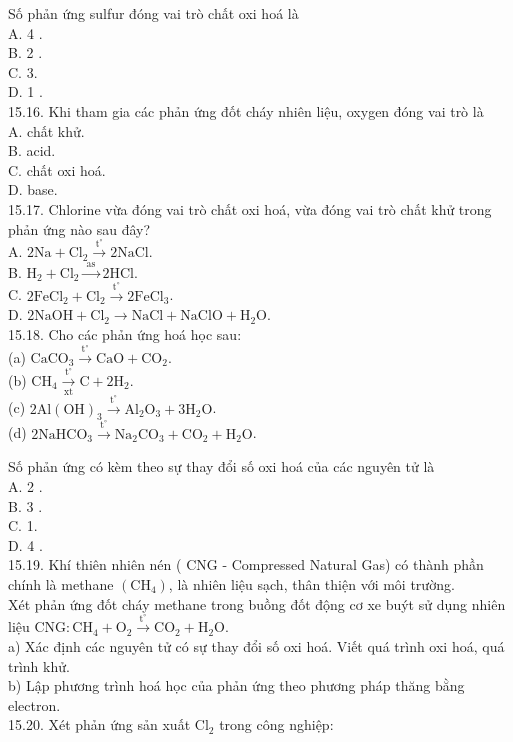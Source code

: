 \documentclass[10pt]{article}
\begin{document}
Số phản ứng sulfur đóng vai trò chất oxi hoá là\\
A. 4 .\\
B. 2 .\\
C. 3.\\
D. 1 .\\
15.16. Khi tham gia các phản ứng đốt cháy nhiên liệu, oxygen đóng vai trò là\\
A. chất khử.\\
B. acid.\\
C. chất oxi hoá.\\
D. base.\\
15.17. Chlorine vừa đóng vai trò chất oxi hoá, vừa đóng vai trò chất khử trong phản ứng nào sau đây?\\
A. $2 \mathrm{Na}+\mathrm{Cl}_{2} \xrightarrow{\mathrm{t}^{\circ}} 2 \mathrm{NaCl}$.\\
B. $\mathrm{H}_{2}+\mathrm{Cl}_{2} \xrightarrow{\text { as }} 2 \mathrm{HCl}$.\\
C. $2 \mathrm{FeCl}_{2}+\mathrm{Cl}_{2} \xrightarrow{\mathrm{t}^{\circ}} 2 \mathrm{FeCl}_{3}$.\\
D. $2 \mathrm{NaOH}+\mathrm{Cl}_{2} \longrightarrow \mathrm{NaCl}+\mathrm{NaClO}+\mathrm{H}_{2} \mathrm{O}$.\\
15.18. Cho các phản ứng hoá học sau:\\
(a) $\mathrm{CaCO}_{3} \xrightarrow{\mathrm{t}^{\circ}} \mathrm{CaO}+\mathrm{CO}_{2}$.\\
(b) $\mathrm{CH}_{4} \xrightarrow[\mathrm{xt}]{\mathrm{t}^{\circ}} \mathrm{C}+2 \mathrm{H}_{2}$.\\
(c) $2 \mathrm{Al}(\mathrm{OH})_{3} \xrightarrow{\mathrm{t}^{\circ}} \mathrm{Al}_{2} \mathrm{O}_{3}+3 \mathrm{H}_{2} \mathrm{O}$.\\
(d) $2 \mathrm{NaHCO}_{3} \xrightarrow{\mathrm{t}^{\circ}} \mathrm{Na}_{2} \mathrm{CO}_{3}+\mathrm{CO}_{2}+\mathrm{H}_{2} \mathrm{O}$.

Số phản ứng có kèm theo sự thay đổi số oxi hoá của các nguyên tử là\\
A. 2 .\\
B. 3 .\\
C. 1.\\
D. 4 .\\
15.19. Khí thiên nhiên nén ( CNG - Compressed Natural Gas) có thành phần chính là methane $\left(\mathrm{CH}_{4}\right)$, là nhiên liệu sạch, thân thiện với môi trường.\\
Xét phản ứng đốt cháy methane trong buồng đốt động cơ xe buýt sử dụng nhiên liệu $\mathrm{CNG}: \mathrm{CH}_{4}+\mathrm{O}_{2} \xrightarrow{\mathrm{t}^{\circ}} \mathrm{CO}_{2}+\mathrm{H}_{2} \mathrm{O}$.\\
a) Xác định các nguyên tử có sự thay đổi số oxi hoá. Viết quá trình oxi hoá, quá trình khử.\\
b) Lập phương trình hoá học của phản ứng theo phương pháp thăng bằng electron.\\
15.20. Xét phản ứng sản xuất $\mathrm{Cl}_{2}$ trong công nghiệp:
\end{document}

